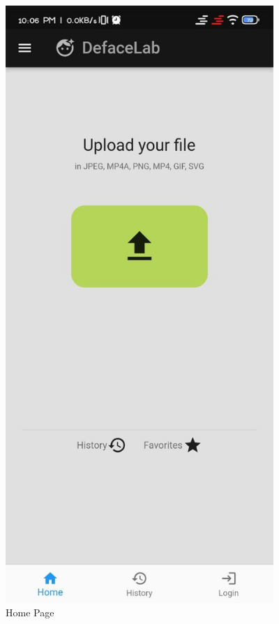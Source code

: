 \begin{figure}[h]
    \centering
    \includegraphics[width= 4in,height =8 in ]{img/homepage.jpg}
    \caption{Home Page}
\end{figure}

